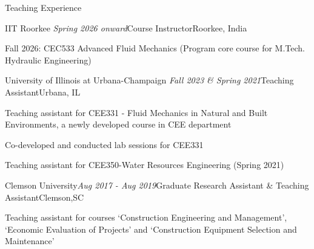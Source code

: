 \documentclass{resume} %
\begin{document}
\begin{rSection}{Teaching Experience}
\begin{rSubsection}{IIT Roorkee} {\em Spring 2026 onward}{Course Instructor}{Roorkee, India}
\item Fall 2026: CEC533 Advanced Fluid Mechanics (Program core course for M.Tech. Hydraulic Engineering)
\end{rSubsection}

\begin{rSubsection}{University of Illinois at Urbana-Champaign} {\em Fall 2023 \& Spring 2021}{Teaching Assistant}{Urbana, IL}
\item Teaching assistant for CEE331 - Fluid Mechanics in Natural and Built Environments, a newly developed course in CEE department
\item Co-developed and conducted lab sessions for CEE331
\item Teaching assistant for CEE350-Water Resources Engineering (Spring 2021)
\end{rSubsection}

\begin{rSubsection}{Clemson University}{\em Aug 2017 - Aug 2019}{Graduate Research Assistant \& Teaching Assistant}{Clemson,SC}
\item Teaching assistant for courses `Construction Engineering and Management', `Economic Evaluation of Projects' and `Construction Equipment Selection and Maintenance' 
\end{rSubsection}


\end{rSection}
\end{document}

